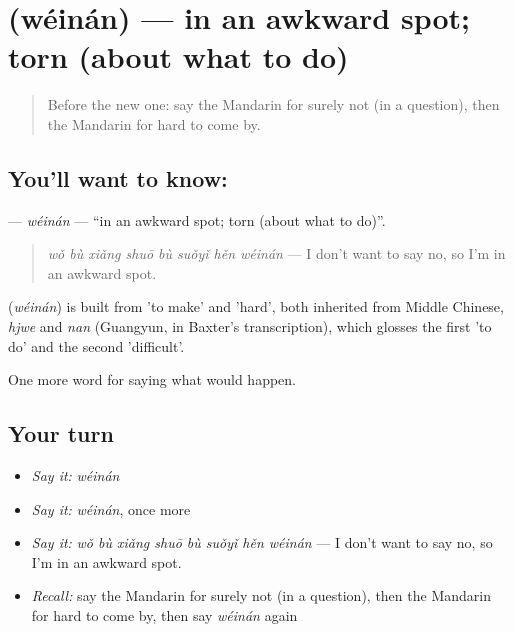\section[\texorpdfstring{\zh{为难} (wéinán)}{为难 (wéinán)}]{ (wéinán) — in an awkward spot; torn (about what to do)}

\label{lesson:ZH-C397-weinan}



\begin{quote}
Before the new one: say the Mandarin for surely not (in a question), then the Mandarin for hard to come by.
\end{quote}

\subsection*{You'll want to know: }
\textbf{} — \emph{wéinán} — \textquotedblleft{}in an awkward spot; torn (about what to do)\textquotedblright{}.

\begin{quote}
\textbf{} \emph{wǒ bù xiǎng shuō bù suǒyǐ hěn wéinán} — I don't want to say no, so I'm in an awkward spot.
\end{quote}

\begin{cousinweb}
\textbf{} (\emph{wéinán}) is built from  'to make' and  'hard', both inherited from Middle Chinese, \emph{hjwe} and \emph{nan} (Guangyun, in Baxter's transcription), which glosses the first 'to do' and the second 'difficult'.
\end{cousinweb}

\begin{grammarlens}[title={What you've built}]
One more word for saying what would happen.
\end{grammarlens}

\subsection*{Your turn}
\begin{itemize}
\raggedright
  \item \emph{Say it:} \emph{wéinán}
  \item \emph{Say it:} \emph{wéinán}, once more
  \item \emph{Say it:} \emph{wǒ bù xiǎng shuō bù suǒyǐ hěn wéinán} — I don't want to say no, so I'm in an awkward spot.
  \item \emph{Recall:} say the Mandarin for surely not (in a question), then the Mandarin for hard to come by, then say \emph{wéinán} again
\end{itemize}

